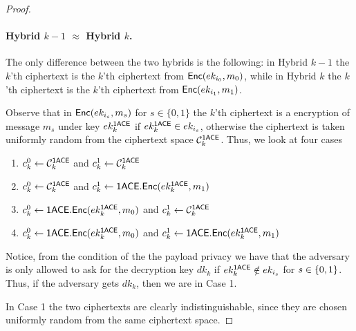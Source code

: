 \documentclass{llncs}
\begin{document}
\begin{proof}
\paragraph{Hybrid $k-1$ $\approx$ Hybrid $k$.} 
The only difference between the two hybrids is the following: in Hybrid $k-1$ the $k$'th \oACE ciphertext is the $k$'th ciphertext from $\mathsf{Enc}(ek_{i_0},m_0)$, while in Hybrid $k$ the $k$'th \oACE ciphertext is the $k$'th ciphertext from $\mathsf{Enc}(ek_{i_1},m_1)$.

Observe that in $\mathsf{Enc}(ek_{i_s},m_s)$ for $s \in \{0,1 \}$ the $k$'th ciphertext is a \oACE encryption of message $m_s$ under key $ek_k^{\mathsf{1ACE}}$ if $ek_k^{\mathsf{1ACE}} \in ek_{i_s}$, otherwise the ciphertext is taken uniformly random from the \oACE ciphertext space $\mathcal{C}_k^{\mathsf{1ACE}}$.
Thus, we look at four cases
\begin{enumerate}
\item $c_k^0 \gets \mathcal{C}_k^{\mathsf{1ACE}}$ and $c_k^1 \gets \mathcal{C}_k^{\mathsf{1ACE}}$
\item $c_k^0 \gets \mathcal{C}_k^{\mathsf{1ACE}}$ and $c_k^1 \gets \mathsf{1ACE}.\mathsf{Enc}(ek_k^{\mathsf{1ACE}},m_1)$
\item $c_k^0 \gets \mathsf{1ACE}.\mathsf{Enc}(ek_k^{\mathsf{1ACE}},m_0)$ and $c_k^1 \gets \mathcal{C}_k^{\mathsf{1ACE}}$
\item $c_k^0 \gets \mathsf{1ACE}.\mathsf{Enc}(ek_k^{\mathsf{1ACE}},m_0)$ and $c_k^1 \gets \mathsf{1ACE}.\mathsf{Enc}(ek_k^{\mathsf{1ACE}},m_1)$
\end{enumerate}

Notice, from the condition of the the payload privacy we have that the adversary is only allowed to ask for the decryption key $dk_k$ if $ek_k^{\mathsf{1ACE}} \notin ek_{i_s}$ for $s \in \{0,1\}$. 
Thus, if the adversary gets $dk_k$, then we are in Case 1.

In Case 1 the two ciphertexts are clearly indistinguishable, since they are chosen uniformly random from the same ciphertext space. 


\end{proof}
\end{document}
